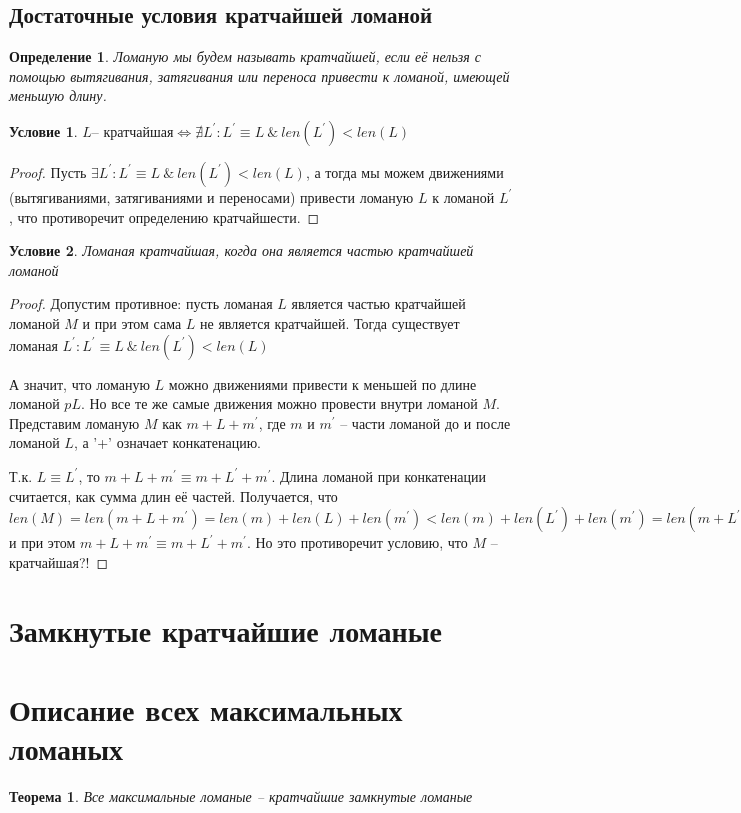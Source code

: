 \documentclass[12pt,a4paper, flushleft]{article}
\newtheorem{Def}{Определение}[section]
\newtheorem{Th}{Теорема}[section]
\newtheorem{Con}{Условие}[section]
\newcommand{\p}[1]{#1^{\prime}}
\begin{document}
\subsection{Достаточные условия кратчайшей ломаной}
\begin{Def}
Ломаную мы будем называть кратчайшей, если её нельзя с помощью вытягивания, затягивания
или переноса привести к ломаной, имеющей меньшую длину.
\end{Def}

\begin{Con}
	$L \text{-- кратчайшая}\Longleftrightarrow\nexists \p L: \p L\equiv L ~\&~ len(\p L)<len(L)$
\end{Con}
\begin{proof}
	Пусть $\exists \p L: \p L\equiv L ~\&~ len(\p L)<len(L)$, а тогда мы можем движениями (вытягиваниями, затягиваниями и переносами) привести ломаную $L$  к ломаной $\p L$, что противоречит определению кратчайшести.
\end{proof}	

\begin{Con}
	Ломаная кратчайшая, когда она является частью кратчайшей ломаной
\end{Con}
\begin{proof}
	Допустим противное: пусть ломаная $L$ является частью кратчайшей ломаной $M$ и при этом сама $L$ не является кратчайшей. Тогда существует ломаная $\p L: \p L\equiv L~\&~ len(\p L)<len(L)$
	
	А значит, что ломаную $L$ можно движениями привести к меньшей по длине ломаной $p L$. Но все те же самые движения можно провести внутри ломаной $M$. Представим ломаную $M$ как $m + L + \p m$, где $m$ и $\p m$ -- части ломаной до и после ломаной $L$, а '+' означает конкатенацию. 
	
	Т.к. $L\equiv \p L$, то $m + L + \p m\equiv m+\p L + \p m$. Длина ломаной при конкатенации считается, как сумма длин её частей. Получается, что $len(M) = len(m+L+\p m) = len(m) + len(L) + len(\p m) < len(m) + len(\p L) + len(\p m) = len(m+\p L + \p m)$ и при этом $m+L+\p m\equiv m+\p L+\p m$. Но это противоречит условию, что $M$ -- кратчайшая?!
	
	
\end{proof}

\section{Замкнутые кратчайшие ломаные}

\section{Описание всех максимальных ломаных}
\begin{Th}
	Все максимальные ломаные -- кратчайшие замкнутые ломаные	
\end{Th}
\end{document}
